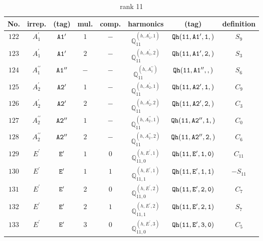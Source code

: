 \documentclass[fleqn,8pt]{jsarticle}
\begin{document}
\begin{table}[ht!]
\begin{center}
\caption{rank 11}
\renewcommand{\arraystretch}{1.3}
\begin{tabular}{cccccccc} \hline \hline
No. & irrep. & (tag) & mul. & comp. & harmonics & (tag) & definition \\ \hline
$ 122 $ & $ A_{1}^{\prime} $ & $ {\tt A1'} $ & $ 1 $ & $ - $ & $ \mathbb{Q}_{11}^{(h,A_{1}^{\prime},1)} $ & $ {\tt Qh(11,A1',1,)} $ & $ S_{9} $ \\
$ 123 $ & $ A_{1}^{\prime} $ & $ {\tt A1'} $ & $ 2 $ & $ - $ & $ \mathbb{Q}_{11}^{(h,A_{1}^{\prime},2)} $ & $ {\tt Qh(11,A1',2,)} $ & $ S_{3} $ \\
$ 124 $ & $ A_{1}^{\prime\prime} $ & $ {\tt A1''} $ & $ - $ & $ - $ & $ \mathbb{Q}_{11}^{(h,A_{1}^{\prime\prime})} $ & $ {\tt Qh(11,A1'',,)} $ & $ S_{6} $ \\
$ 125 $ & $ A_{2}^{\prime} $ & $ {\tt A2'} $ & $ 1 $ & $ - $ & $ \mathbb{Q}_{11}^{(h,A_{2}^{\prime},1)} $ & $ {\tt Qh(11,A2',1,)} $ & $ C_{9} $ \\
$ 126 $ & $ A_{2}^{\prime} $ & $ {\tt A2'} $ & $ 2 $ & $ - $ & $ \mathbb{Q}_{11}^{(h,A_{2}^{\prime},2)} $ & $ {\tt Qh(11,A2',2,)} $ & $ C_{3} $ \\
$ 127 $ & $ A_{2}^{\prime\prime} $ & $ {\tt A2''} $ & $ 1 $ & $ - $ & $ \mathbb{Q}_{11}^{(h,A_{2}^{\prime\prime},1)} $ & $ {\tt Qh(11,A2'',1,)} $ & $ C_{0} $ \\
$ 128 $ & $ A_{2}^{\prime\prime} $ & $ {\tt A2''} $ & $ 2 $ & $ - $ & $ \mathbb{Q}_{11}^{(h,A_{2}^{\prime\prime},2)} $ & $ {\tt Qh(11,A2'',2,)} $ & $ C_{6} $ \\
$ 129 $ & $ E^{\prime} $ & $ {\tt E'} $ & $ 1 $ & $ 0 $ & $ \mathbb{Q}_{11,0}^{(h,E^{\prime},1)} $ & $ {\tt Qh(11,E',1,0)} $ & $ C_{11} $ \\
$ 130 $ & $ E^{\prime} $ & $ {\tt E'} $ & $ 1 $ & $ 1 $ & $ \mathbb{Q}_{11,1}^{(h,E^{\prime},1)} $ & $ {\tt Qh(11,E',1,1)} $ & $ - S_{11} $ \\
$ 131 $ & $ E^{\prime} $ & $ {\tt E'} $ & $ 2 $ & $ 0 $ & $ \mathbb{Q}_{11,0}^{(h,E^{\prime},2)} $ & $ {\tt Qh(11,E',2,0)} $ & $ C_{7} $ \\
$ 132 $ & $ E^{\prime} $ & $ {\tt E'} $ & $ 2 $ & $ 1 $ & $ \mathbb{Q}_{11,1}^{(h,E^{\prime},2)} $ & $ {\tt Qh(11,E',2,1)} $ & $ S_{7} $ \\
$ 133 $ & $ E^{\prime} $ & $ {\tt E'} $ & $ 3 $ & $ 0 $ & $ \mathbb{Q}_{11,0}^{(h,E^{\prime},3)} $ & $ {\tt Qh(11,E',3,0)} $ & $ C_{5} $ \\

\end{tabular}
\end{center}
\end{table}
\end{document}
